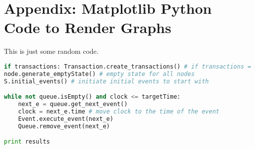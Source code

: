 \sectionfont{\large}
\section{Appendix: Matplotlib Python Code to Render Graphs}
This is just some random code.
\begin{lstlisting}[language=Python]
if transactions: Transaction.create_transactions() # if transactions = "true"
node.generate_emptyState() # empty state for all nodes
S.initial_events() # initiate initial events to start with

while not queue.isEmpty() and clock <= targetTime:
    next_e = queue.get_next_event()
    clock = next_e.time # move clock to the time of the event
    Event.execute_event(next_e)
    Queue.remove_event(next_e)

print results
\end{lstlisting}
